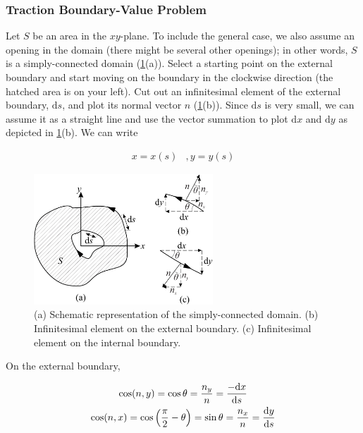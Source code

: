 \documentclass{article}
\begin{document}
\subsubsection{Traction Boundary-Value Problem}
Let $S$ be an area in the $xy$-plane. To include the general case, we also assume an opening in the domain (there might be several other openings); in other words, $S$ is a simply-connected domain (\cref{fig:domain}(a)). Select a starting point on the external boundary and start moving on the boundary in the clockwise direction (the hatched area is on your left). Cut out an infinitesimal element of the external boundary, $\mathrm{d}s$, and plot its normal vector $n$ (\cref{fig:domain}(b)). Since $\mathrm{d}s$ is very small, we can assume it as a straight line and use the vector summation to plot $\mathrm{d}x$ and $\mathrm{d}y$ as depicted in \cref{fig:domain}(b). We can write

\begin{equation}
    \begin{matrix}
    x = x(s) & , 
    y = y(s)
    \end{matrix}
    \label{eq:x_y_function_s}
\end{equation}

\begin{figure}[H]
    \centering
    \includegraphics[width = 0.6\textwidth ]{figures/domain.pdf}
    \caption{(a) Schematic representation of the simply-connected domain. (b) Infinitesimal element on the external boundary. (c) Infinitesimal element on the internal boundary.}
    \label{fig:domain}
\end{figure}

On the external boundary,

\begin{gather}
    \cos(n, y) = \cos \theta = \dfrac{n_y}{n} = \dfrac{-\mathrm{d}x}{\mathrm{d}s}  \notag \\
    \cos(n, x) = \cos \left(\dfrac{\pi}{2} - \theta\right) = \sin \theta = \dfrac{n_x}{n} = \dfrac{\mathrm{d}y}{\mathrm{d}s}
    \label{eq:exterbal_boundary}
\end{gather}
\end{document}
